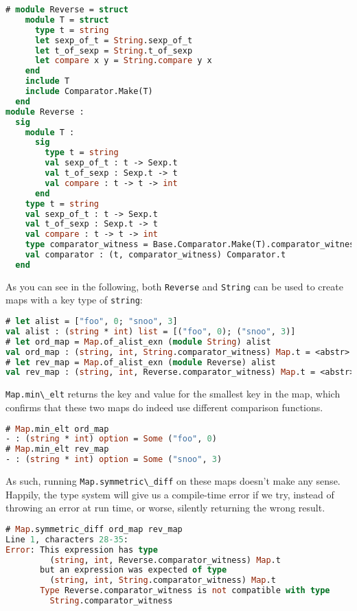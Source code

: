 \begin{lstlisting}[language=Caml]
# module Reverse = struct
    module T = struct
      type t = string
      let sexp_of_t = String.sexp_of_t
      let t_of_sexp = String.t_of_sexp
      let compare x y = String.compare y x
    end
    include T
    include Comparator.Make(T)
  end
module Reverse :
  sig
    module T :
      sig
        type t = string
        val sexp_of_t : t -> Sexp.t
        val t_of_sexp : Sexp.t -> t
        val compare : t -> t -> int
      end
    type t = string
    val sexp_of_t : t -> Sexp.t
    val t_of_sexp : Sexp.t -> t
    val compare : t -> t -> int
    type comparator_witness = Base.Comparator.Make(T).comparator_witness
    val comparator : (t, comparator_witness) Comparator.t
  end
\end{lstlisting}

As you can see in the following, both \passthrough{\lstinline!Reverse!}
and \passthrough{\lstinline!String!} can be used to create maps with a
key type of \passthrough{\lstinline!string!}:

\begin{lstlisting}[language=Caml]
# let alist = ["foo", 0; "snoo", 3]
val alist : (string * int) list = [("foo", 0); ("snoo", 3)]
# let ord_map = Map.of_alist_exn (module String) alist
val ord_map : (string, int, String.comparator_witness) Map.t = <abstr>
# let rev_map = Map.of_alist_exn (module Reverse) alist
val rev_map : (string, int, Reverse.comparator_witness) Map.t = <abstr>
\end{lstlisting}

\passthrough{\lstinline!Map.min\_elt!} returns the key and value for the
smallest key in the map, which confirms that these two maps do indeed
use different comparison functions.

\begin{lstlisting}[language=Caml]
# Map.min_elt ord_map
- : (string * int) option = Some ("foo", 0)
# Map.min_elt rev_map
- : (string * int) option = Some ("snoo", 3)
\end{lstlisting}

As such, running \passthrough{\lstinline!Map.symmetric\_diff!} on these
maps doesn't make any sense. Happily, the type system will give us a
compile-time error if we try, instead of throwing an error at run time,
or worse, silently returning the wrong result.

\begin{lstlisting}[language=Caml]
# Map.symmetric_diff ord_map rev_map
Line 1, characters 28-35:
Error: This expression has type
         (string, int, Reverse.comparator_witness) Map.t
       but an expression was expected of type
         (string, int, String.comparator_witness) Map.t
       Type Reverse.comparator_witness is not compatible with type
         String.comparator_witness
\end{lstlisting}

